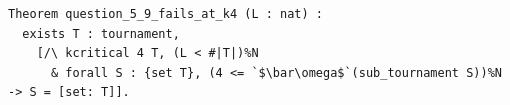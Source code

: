 \begin{lstlisting}[language=Rocq]
Theorem question_5_9_fails_at_k4 (L : nat) :
  exists T : tournament,
    [/\ kcritical 4 T, (L < #|T|)%N
      & forall S : {set T}, (4 <= `$\bar\omega$`(sub_tournament S))%N -> S = [set: T]].
\end{lstlisting}
